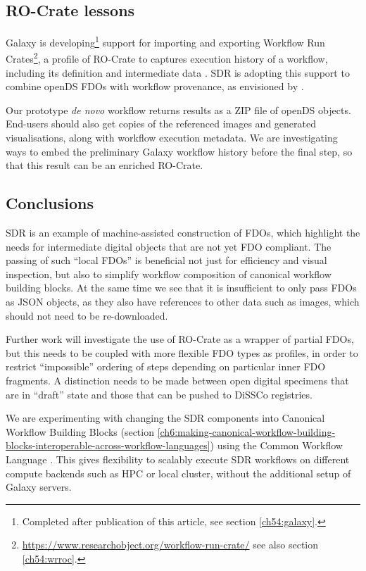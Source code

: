 \subsection{RO-Crate lessons}\label{ch7:ro-crate-lessons}

Galaxy is developing\footnote{
    Completed after publication of this article, see section \vref{ch54:galaxy}.
} support for importing and
exporting Workflow
Run Crates\footnote{\url{https://www.researchobject.org/workflow-run-crate/} see also section \vref{ch54:wrroc}.}, a profile of RO-Crate \cite{Soiland-Reyes 2022a} to
captures execution history of a workflow, including its definition and
intermediate data \cite{De Geest 2022}. SDR is adopting this support to
combine openDS FDOs with workflow provenance, as envisioned by
\cite{Walton 2020a}.

Our prototype \emph{de novo} workflow returns results as a ZIP file of
openDS objects. End-users should also get copies of the referenced
images and generated visualisations, along with workflow execution
metadata. We are investigating ways to embed the preliminary Galaxy
workflow history before the final step, so that this result can be an
enriched RO-Crate.

\subsection{Conclusions}\label{ch7:conclusions}

SDR is an example of machine-assisted construction of FDOs, which
highlight the needs for intermediate digital objects that are not yet
FDO compliant. The passing of such ``local FDOs'' is beneficial not just
for efficiency and visual inspection, but also to simplify workflow
composition of canonical workflow building blocks. At the same time we
see that it is insufficient to only pass FDOs as JSON objects, as they
also have references to other data such as images, which should not need
to be re-downloaded.

Further work will investigate the use of RO-Crate as a wrapper of
partial FDOs, but this needs to be coupled with more flexible FDO types
as profiles, in order to restrict ``impossible'' ordering of steps
depending on particular inner FDO fragments. A distinction needs to be
made between open digital specimens that are in ``draft'' state and
those that can be pushed to DiSSCo registries.

We are experimenting with changing the SDR components into Canonical
Workflow Building Blocks \cite{Soiland-Reyes 2022b}
(section \vref{ch6:making-canonical-workflow-building-blocks-interoperable-across-workflow-languages}) 
using the Common Workflow Language \cite{Crusoe 2022}. This gives
flexibility to scalably execute SDR workflows on different compute
backends such as HPC or local cluster, without the additional setup of
Galaxy servers.

